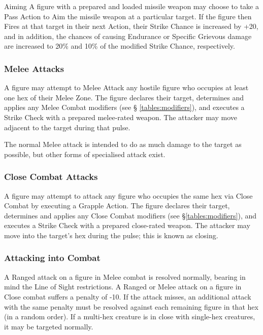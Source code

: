 \begin{multicols*}{3}
\begin{Description}
\item[Aiming] A figure with a prepared and loaded missile weapon may
choose to take a Pass Action to Aim the missile weapon at a particular
target. If the figure then Fires at that target in their next Action,
their Strike Chance is increased by +20, and in addition, the chances
of causing Endurance or Specific Grievous damage are increased to 20\%
and 10\% of the modified Strike Chance, respectively.
\end{Description}

\subsubsection{Melee Attacks}

A figure may attempt to Melee Attack any hostile figure who occupies
at least one hex of their Melee Zone. The figure declares their
target, determines and applies any Melee Combat modifiers (see \S
\ref{tables:modifiers}), and executes a Strike Check with a prepared
melee-rated weapon. The attacker may move adjacent to the target
during that pulse.

The normal Melee attack is intended to do as much damage to the target
as possible, but other forms of specialised attack exist.

\subsubsection{Close Combat Attacks}

A figure may attempt to attack any figure who occupies the same hex
via Close Combat by executing a Grapple Action. The figure declares
their target, determines and applies any Close Combat modifiers (see
\S \ref{tables:modifiers}), and executes a Strike Check with a
prepared close-rated weapon. The attacker may move into the target's
hex during the pulse; this is known as closing.

\subsubsection{Attacking into Combat}

A Ranged attack on a figure in Melee combat is resolved normally,
bearing in mind the Line of Sight restrictions. A Ranged or Melee
attack on a figure in Close combat suffers a penalty of -10. If the
attack misses, an additional attack with the same penalty must be
resolved against each remaining figure in that hex (in a random
order). If a multi-hex creature is in close with single-hex creatures,
it may be targeted normally.


\end{multicols*}
